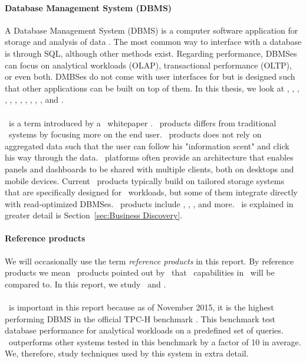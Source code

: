 \paragraph{Database Management System (DBMS)}
\label{par:Database Management System (DBMS)}
A Database Management System (DBMS) is a computer software application for storage and analysis of data \cite{Wikipedia_contributors2015-pb}. The most common way to interface with a database is through SQL, although other methods exist. Regarding performance, DBMSes can focus on analytical workloads (OLAP), transactional performance (OLTP), or even both. DMBSes do not come with user interfaces for \bd but is designed such that other applications can be built on top of them. In this thesis, we look at \oracle, \ibm, \saph, \sapnw, \mssql, \cstore, \vertica, \blink, \exasol, \oracle, \hyper, and \hyrise.

\paragraph{\bd}
\label{par:Business Discovery}
\bd~is a term introduced by a \qlikview~whitepaper \cite{Qlik2014-vd}. \bd~products differs from traditional \bi~systems by focusing more on the end user. \bd~products does not rely on aggregated data such that the user can follow his "information scent" and click his way through the data. \bd~platforms often provide an architecture that enables panels and dashboards to be shared with multiple clients, both on desktops and mobile devices. Current \bd~products typically build on tailored storage systems that are specifically designed for \bd~workloads, but some of them integrate directly with read-optimized DBMSes. \bd~products include \tableau, \qlikview, \powerpivot, and more. \bd~is explained in greater detail is Section~\ref{sec:Business Discovery}.

\paragraph{Reference products}
\label{par:Reference products}
We will occasionally use the term \textit{reference products} in this report. By reference products we mean \bd~products pointed out by \genus~that \bd~capabilities in \genusSoftware~will be compared to. In this report, we study \qlikview~and \tableau.

\paragraph{\exasol}
\label{par:exasol}
\exasol~is important in this report because as of November 2015, it is the highest performing DBMS in the official TPC-H benchmark \cite{noauthor_undated-vr}. This benchmark test database performance for analytical workloads on a predefined set of queries. \exasol~outperforms other systems tested in this benchmark by a factor of 10 in average. We, therefore, study techniques used by this system in extra detail.



